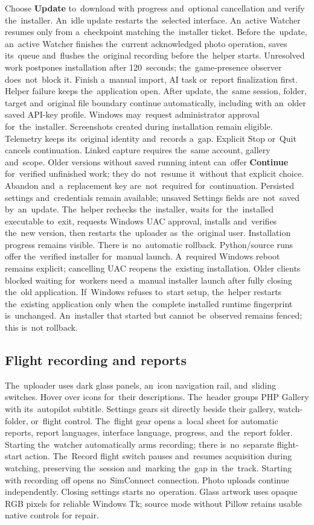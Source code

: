 \documentclass[11pt,a4paper]{article}
\newcommand{\ui}[1]{\textbf{#1}}
\begin{document}
Choose \ui{Update} to~download with progress and~optional cancellation and
verify the~installer. An~idle update restarts the~selected interface.
An~active Watcher resumes only from a~checkpoint matching the~installer ticket.
Before the~update, an~active Watcher finishes the~current acknowledged
photo operation, saves its~queue and~flushes the~original recording before
the~helper starts. Unresolved work postpones installation after 120~seconds;
the~game-presence observer does~not~block it. Finish a~manual import, AI task
or~report finalization first. Helper failure keeps the~application open.
After update, the~same session, folder, target and~original file boundary
continue automatically, including with an~older saved API-key profile.
Windows may~request administrator approval for~the~installer.
Screenshots created during installation remain eligible. Telemetry
keeps its~original identity and~records a~gap. Explicit Stop or~Quit cancels
continuation. Linked capture requires the~same account, gallery and~scope.
Older versions without saved running intent can~offer \ui{Continue}
for~verified unfinished work; they do~not~resume it~without that explicit
choice. Abandon and~a~replacement key are~not~required for~continuation.
Persisted settings and~credentials remain available; unsaved Settings fields
are~not~saved by~an~update.
The~helper rechecks the~installer, waits for~the~installed executable to~exit,
requests Windows UAC approval, installs and~verifies the~new version, then
restarts the~uploader as~the~original user. Installation progress remains visible.
There is~no~automatic rollback. Python/source runs offer the~verified installer
for~manual launch. A~required Windows reboot remains explicit; cancelling UAC
reopens the~existing installation. Older clients blocked waiting for~workers
need a~manual installer launch after fully closing the~old application.
If~Windows refuses to~start setup, the~helper restarts the~existing application
only when the~complete installed runtime fingerprint is~unchanged. An~installer
that started but cannot be~observed remains fenced; this is~not rollback.


\subsection{Flight recording and reports}

The~uploader uses dark glass panels, an~icon navigation rail, and~sliding
switches. Hover over icons for~their descriptions. The~header groups
PHP Gallery with its~autopilot subtitle. Settings gears sit directly beside
their gallery, watch-folder, or~flight control. The~flight gear opens a~local
sheet for automatic reports, report languages, interface language, progress,
and~the~report folder. Starting the~watcher automatically arms recording;
there is~no~separate flight-start action. The~Record flight switch pauses
and~resumes acquisition during watching, preserving the~session and~marking
the~gap in~the~track. Starting with recording off opens no~SimConnect
connection. Photo uploads continue independently. Closing settings starts
no~operation. Glass artwork uses opaque RGB pixels for reliable Windows Tk;
source mode without Pillow retains usable native controls for repair.
\end{document}
